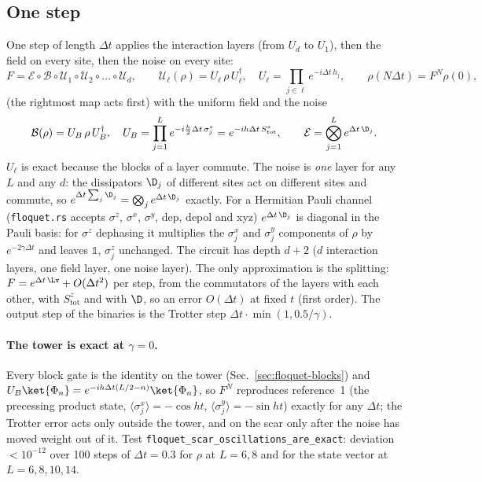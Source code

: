 \subsection{One step}
\label{sec:floquet-step}

One step of length $\Delta t$ applies the interaction layers (from $U_d$ to $U_1$), then the field on every site, then the noise on every site:
\begin{equation}
F = \mathcal E \circ \mathcal B \circ \mathcal U_1 \circ \mathcal U_2 \circ \dots \circ \mathcal U_d, \qquad
\mathcal U_\ell(\rho) = U_\ell\,\rho\,U_\ell^\dagger, \quad U_\ell = \prod_{j \in \ell} e^{-i\Delta t\, h_j}, \qquad
\rho(N\Delta t) = F^N \rho(0),
\label{eq:floquet-step}
\end{equation}
(the rightmost map acts first) with the uniform field and the noise
\begin{equation}
\mathcal B(\rho) = U_B\,\rho\,U_B^\dagger, \quad U_B = \prod_{j=1}^{L} e^{-i\frac h2 \Delta t\, \sigma^z_j} = e^{-ih\Delta t\, S^z_{\mathrm{tot}}}, \qquad
\mathcal E = \bigotimes_{j=1}^{L} e^{\Delta t\, \D_j} .
\label{eq:floquet-field-noise}
\end{equation}
$U_\ell$ is exact because the blocks of a layer commute. The noise is \emph{one} layer for any $L$ and any $d$: the dissipators $\D_j$ of different sites act on different sites and commute, so $e^{\Delta t \sum_j \D_j} = \bigotimes_j e^{\Delta t\, \D_j}$ exactly. For a Hermitian Pauli channel (\texttt{floquet.rs} accepts $\sigma^z$, $\sigma^x$, $\sigma^y$, dep, depol and xyz) $e^{\Delta t\, \D_j}$ is diagonal in the Pauli basis: for $\sigma^z$ dephasing it multiplies the $\sigma^x_j$ and $\sigma^y_j$ components of $\rho$ by $e^{-2\gamma\Delta t}$ and leaves $\mathds 1$, $\sigma^z_j$ unchanged. The circuit has depth $d + 2$ ($d$ interaction layers, one field layer, one noise layer). The only approximation is the splitting: $F = e^{\Delta t\, \Lv} + O(\Delta t^2)$ per step, from the commutators of the layers with each other, with $S^z_{\mathrm{tot}}$ and with $\D$, so an error $O(\Delta t)$ at fixed $t$ (first order). The output step of the binaries is the Trotter step $\Delta t \cdot \min(1, 0.5/\gamma)$.

\paragraph{The tower is exact at $\gamma = 0$.} Every block gate is the identity on the tower (Sec.~\ref{sec:floquet-blocks}) and $U_B\ket{\Phi_n} = e^{-ih\Delta t(L/2 - n)}\ket{\Phi_n}$, so $F^N$ reproduces reference~1 (the precessing product state, $\langle\sigma^x_j\rangle = -\cos ht$, $\langle\sigma^y_j\rangle = -\sin ht$) exactly for any $\Delta t$; the Trotter error acts only outside the tower, and on the scar only after the noise has moved weight out of it. Test \texttt{floquet\_scar\_oscillations\_are\_exact}: deviation $< 10^{-12}$ over 100 steps of $\Delta t = 0.3$ for $\rho$ at $L = 6, 8$ and for the state vector at $L = 6, 8, 10, 14$.


